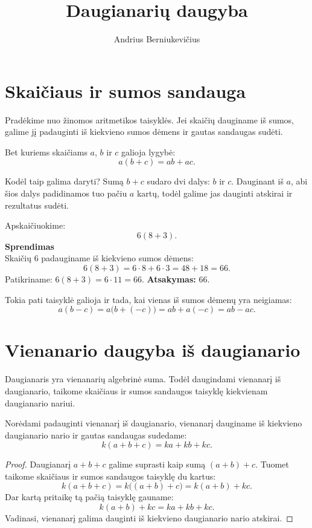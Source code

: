 \documentclass[11pt,a4paper]{scrartcl}
\title{Daugianarių daugyba}
\author{Andrius Berniukevičius}
\begin{document}
\maketitle

\section{Skaičiaus ir sumos sandauga}

Pradėkime nuo žinomos aritmetikos taisyklės. Jei skaičių dauginame iš sumos, galime jį padauginti iš kiekvieno sumos dėmens ir gautas sandaugas sudėti.

\begin{property}
Bet kuriems skaičiams $a$, $b$ ir $c$ galioja lygybė:
\[
a(b+c)=ab+ac.
\]
\end{property}

Kodėl taip galima daryti? Sumą $b+c$ sudaro dvi dalys: $b$ ir $c$. Dauginant iš $a$, abi šios dalys padidinamos tuo pačiu $a$ kartų, todėl galime jas dauginti atskirai ir rezultatus sudėti.

\begin{example}
Apskaičiuokime:
\[
6(8+3).
\]
\textbf{Sprendimas}\\
Skaičių $6$ padauginame iš kiekvieno sumos dėmens:
\[
6(8+3)=6\cdot8+6\cdot3=48+18=66.
\]
Patikriname: $6(8+3)=6\cdot11=66$.
\textbf{Atsakymas:} $66$.
\end{example}

Tokia pati taisyklė galioja ir tada, kai vienas iš sumos dėmenų yra neigiamas:
\[
a(b-c)=a\bigl(b+(-c)\bigr)=ab+a(-c)=ab-ac.
\]

\section{Vienanario daugyba iš daugianario}

Daugianaris yra vienanarių algebrinė suma. Todėl daugindami vienanarį iš daugianario, taikome skaičiaus ir sumos sandaugos taisyklę kiekvienam daugianario nariui.

\begin{property}
Norėdami padauginti vienanarį iš daugianario, vienanarį dauginame iš kiekvieno daugianario nario ir gautas sandaugas sudedame:
\[
k(a+b+c)=ka+kb+kc.
\]
\end{property}

\begin{proof}
Daugianarį $a+b+c$ galime suprasti kaip sumą $(a+b)+c$. Tuomet taikome skaičiaus ir sumos sandaugos taisyklę du kartus:
\[
k(a+b+c)=k\bigl((a+b)+c\bigr)=k(a+b)+kc.
\]
Dar kartą pritaikę tą pačią taisyklę gauname:
\[
k(a+b)+kc=ka+kb+kc.
\]
Vadinasi, vienanarį galima dauginti iš kiekvieno daugianario nario atskirai.
\end{proof}
\end{document}
